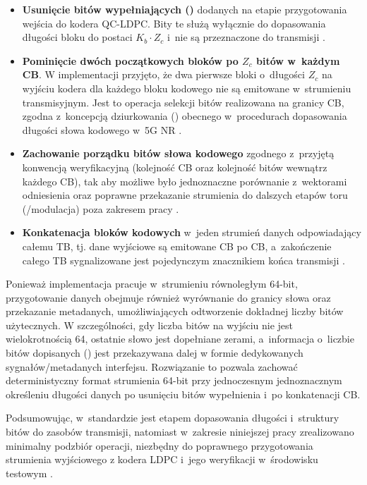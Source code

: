\begin{itemize}
  \item \textbf{Usunięcie bitów wypełniających ()} dodanych na etapie przygotowania wejścia do kodera QC-LDPC.
  Bity te służą wyłącznie do dopasowania długości bloku do postaci $K_b \cdot Z_c$ i~nie są przeznaczone do transmisji \cite{bib:3gpp_38212}.

  \item \textbf{Pominięcie dwóch początkowych bloków po $Z_c$ bitów w~każdym CB}.
  W implementacji przyjęto, że dwa pierwsze bloki o~długości $Z_c$ na wyjściu kodera dla każdego bloku kodowego nie są emitowane w~strumieniu transmisyjnym.
  Jest to operacja selekcji bitów realizowana na granicy CB, zgodna z~koncepcją dziurkowania ()  obecnego w~procedurach dopasowania długości słowa kodowego w~5G NR \cite{bib:3gpp_38212}.

  \item \textbf{Zachowanie porządku bitów słowa kodowego} zgodnego z~przyjętą konwencją weryfikacyjną (kolejność CB oraz kolejność bitów
  wewnątrz każdego CB), tak aby możliwe było jednoznaczne porównanie z~wektorami odniesienia oraz poprawne przekazanie strumienia do dalszych
  etapów toru (/modulacja) poza zakresem pracy \cite{bib:3gpp_38212}.

  \item \textbf{Konkatenacja bloków kodowych} w~jeden strumień danych odpowiadający całemu TB, tj. dane wyjściowe są emitowane CB po CB,
  a~zakończenie całego TB sygnalizowane jest pojedynczym znacznikiem końca transmisji \cite{bib:3gpp_38212}.
\end{itemize}


Ponieważ implementacja pracuje w~strumieniu równoległym 64-bit, przygotowanie danych obejmuje również wyrównanie do granicy słowa
oraz przekazanie metadanych, umożliwiających odtworzenie dokładnej liczby bitów użytecznych. W szczególności, gdy liczba bitów na wyjściu
nie jest wielokrotnością 64, ostatnie słowo jest dopełniane zerami, a~informacja o~liczbie bitów dopisanych () jest przekazywana dalej
w formie dedykowanych sygnałów/metadanych interfejsu. Rozwiązanie to pozwala zachować deterministyczny format strumienia 64-bit przy jednoczesnym
jednoznacznym określeniu długości danych po usunięciu bitów wypełnienia i~po konkatenacji CB.

Podsumowując, w~standardzie  jest etapem dopasowania długości i~struktury bitów do zasobów transmisji,
natomiast w~zakresie niniejszej pracy zrealizowano minimalny podzbiór operacji, niezbędny do poprawnego przygotowania strumienia wyjściowego
z kodera LDPC i~jego weryfikacji w~środowisku testowym \cite{bib:3gpp_38212}.
